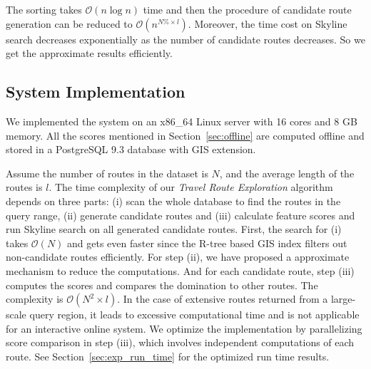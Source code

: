  The sorting takes $\mathcal{O}(n\log{}n)$ time and then the procedure of candidate route generation can be reduced to $\mathcal{O}(n^{N\%\times l})$. Moreover, the time cost on Skyline search decreases exponentially as the number of candidate routes decreases. So we get the approximate results efficiently.

\subsection{System Implementation} \label{sec:implementation}
We implemented the system on an x86\_64 Linux server with 16 cores and 8 GB memory. All the scores mentioned in Section~\ref{sec:offline} are computed offline and stored in a PostgreSQL 9.3 database with GIS extension. %

Assume the number of routes in the dataset is $N$, and the average length of the routes is $l$. The time complexity of our \textit{Travel Route Exploration} algorithm depends on three parts: (i) scan the whole database to find the routes in the query range, (ii) generate candidate routes and (iii) calculate feature scores and run Skyline search on all generated candidate routes. First, the search for (i) takes $\mathcal{O}(N)$ and gets even faster since the R-tree based GIS index filters out non-candidate routes efficiently. For step (ii), we have proposed a approximate mechanism to reduce the computations. And for each candidate route, step (iii) computes the scores and compares the domination to other routes. The complexity is $\mathcal{O}(N^2\times l)$. In the case of extensive routes returned from a large-scale query region, it leads to excessive computational time and is not applicable for an interactive online system. We optimize the implementation by parallelizing score comparison in step (iii), which involves independent computations of each route. See Section~\ref{sec:exp_run_time} for the optimized run time results.


